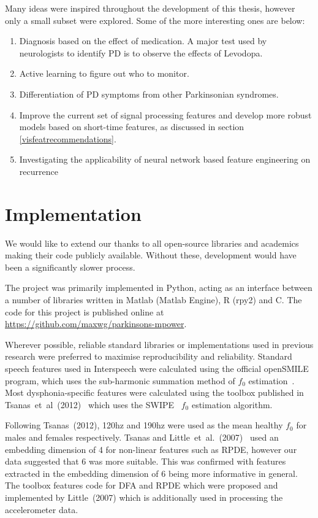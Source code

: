 \documentclass[12pt, twoside]{book}
\begin{document}
Many ideas were inspired throughout the development of this thesis, however only a small subset were explored. Some of the more interesting ones are below:


\begin{enumerate}[noitemsep, topsep=-10pt]
	\item Diagnosis based on the effect of medication. A major test used by neurologists to identify PD is to observe the effects of Levodopa.
	\item Active learning to figure out who to monitor.
	\item Differentiation of PD symptoms from other Parkinsonian syndromes.
	\item Improve the current set of signal processing features and develop more robust models based on short-time features, as discussed in section \ref{visfeatrecommendations}.
	\item Investigating the applicability of neural network based feature engineering on recurrence 
\end{enumerate}



\section{Implementation}
\label{implementation}
We would like to extend our thanks to all open-source libraries and academics making their code publicly available. Without these, development would have been a significantly slower process. 

The project was primarily implemented in Python, acting as an interface between a number of libraries written in Matlab (Matlab Engine), R (rpy2) and C. The code for this project is published online at \url{https://github.com/maxwg/parkinsons-mpower}.

Wherever possible, reliable standard libraries or implementations used in previous research were preferred to maximise reproducibility and reliability. Standard speech features used in Interspeech were calculated using the official openSMILE~\cite{opensmile} program, which uses the sub-harmonic summation method of $f_0$ estimation~\cite{shs}. Most dysphonia-specific features were calculated using the toolbox published in Tsanas~et~al~(2012)~\cite{spoverview} which uses the SWIPE~\cite{camacho2007swipe,f0estimation} $f_0$ estimation algorithm. 

Following Tsanas~(2012), 120hz and 190hz were used as the mean healthy $f_0$ for males and females respectively. Tsanas and Little~et~al.~(2007)~\cite{splittlenonlinear2007} used an embedding dimension of 4 for non-linear features such as RPDE, however our data suggested that 6 was more suitable. This was confirmed with features extracted in the embedding dimension of 6 being more informative in general. The toolbox features code for DFA and RPDE which were proposed and implemented by Little~(2007) which is additionally used in processing the accelerometer data.
\end{document}
